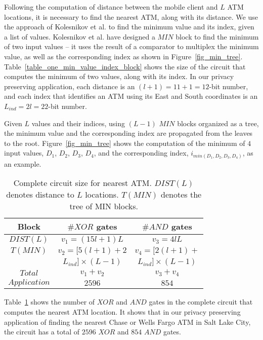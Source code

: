 \documentclass[10pt,journal,cspaper,compsoc]{IEEEtran}
\begin{document}
Following the computation of distance between the mobile client and $L$ ATM locations, it is necessary to find the nearest ATM, along with its distance. We use the approach of Kolesnikov et al. \cite{kolesnikov09} to find the minimum value and its index, given a list of values. Kolesnikov et al. have designed a $MIN$ block to find the minimum of two input values -- it uses the result of a comparator to multiplex the minimum value, as well as the corresponding index as shown in Figure~\ref{fig_min_tree}. Table~\ref{table_one_min_value_index_block} shows the size of the circuit that computes the minimum of two values, along with its index. In our privacy preserving application, each distance is an $(l+1)=11+1=12$-bit number, and each index that identifies an ATM using its East and South coordinates is an $L_{ind}=2l=22$-bit number.


Given $L$ values and their indices, using $(L-1)$ $MIN$ blocks organized as a tree, the minimum value and the corresponding index are propagated from the leaves to the root. Figure~\ref{fig_min_tree} shows the computation of the minimum of $4$ input values, $D_1$, $D_2$, $D_3$, $D_4$, and the corresponding index, $i_{min(D_1,D_2,D_3,D_4)}$, as an example.


\begin{table}[!t]
\renewcommand{\arraystretch}{1.3}
\caption{Complete circuit size for nearest ATM. $DIST(L)$ denotes distance to $L$ locations. $T(MIN)$ denotes the tree of MIN blocks.}
\label{table_complete_circuit_closest_ATM}
\centering
\begin{tabular}{||c||c||c||}
\hline
\bfseries Block & \bfseries $\#XOR$ gates & \bfseries $\#AND$ gates\\
\hline
$DIST(L)$ & $v_1=(15l+1)L$ & $v_3=4lL$\\
\hline
$T(MIN)$ & $v_2=[5(l+1)+2$ & $v_4=[2(l+1)+$\\
 & $L_{ind}]\times (L-1)$ & $L_{ind}]\times (L-1)$\\
\hline
$Total$ & $v_1+v_2$ &$v_3+v_4$\\
\hline
\hline
$Application$ & $2596$ & $854$\\
\hline
\end{tabular}
\end{table}

Table~\ref{table_complete_circuit_closest_ATM} shows the number of $XOR$ and $AND$ gates in the complete circuit that computes the nearest ATM location. It shows that in our privacy preserving application of finding the nearest Chase or Wells Fargo ATM in Salt Lake City, the circuit has a total of $2596$ $XOR$ and $854$ $AND$ gates.
\end{document}
